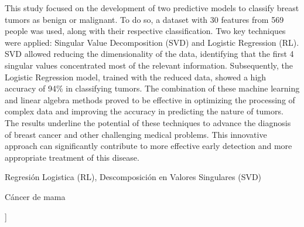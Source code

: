 \documentclass[a4paper,10pt,twocolumn]{article}
\begin{document}
\begin{enabstract}

This study focused on the development of two predictive models to classify breast tumors as benign or malignant. To do so, a dataset with 30 features from 569 people was used, along with their respective classification. Two key techniques were applied: Singular Value Decomposition (SVD) and Logistic Regression (RL). SVD allowed reducing the dimensionality of the data, identifying that the first 4 singular values ​​concentrated most of the relevant information. Subsequently, the Logistic Regression model, trained with the reduced data, showed a high accuracy of 94\% in classifying tumors.
The combination of these machine learning and linear algebra methods proved to be effective in optimizing the processing of complex data and improving the accuracy in predicting the nature of tumors. The results underline the potential of these techniques to advance the diagnosis of breast cancer and other challenging medical problems. This innovative approach can significantly contribute to more effective early detection and more appropriate treatment of this disease.
\end{enabstract}

\begin{keywords}
	Regresión Logistica (RL),
	Descomposición en Valores Singulares (SVD)
\end{keywords}

\begin{topics}
	Cáncer de mama
\end{topics}


\vspace{0.8cm}
]



\end{document}

